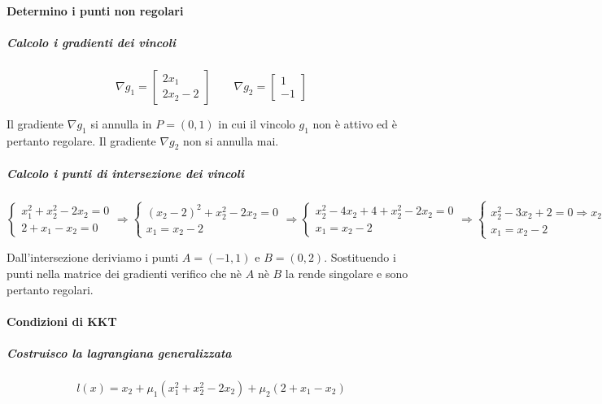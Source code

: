 \documentclass[\main/main.tex]{subfiles}
\begin{document}
\paragraph*{Determino i punti non regolari}

\subparagraph*{Calcolo i gradienti dei vincoli}

\[
  \nabla g_1 = \begin{bmatrix}
    2x_1 \\
    2x_2 - 2
  \end{bmatrix}
  \qquad
  \nabla g_2 = \begin{bmatrix}
    1 \\
    -1
  \end{bmatrix}
\]

Il gradiente $\nabla g_1$ si annulla in $P = (0, 1)$ in cui il vincolo $g_1$ non è attivo ed è pertanto regolare. Il gradiente $\nabla g_2$ non si annulla mai.

\subparagraph*{Calcolo i punti di intersezione dei vincoli}

\[
  \begin{cases}
    x_1^2 + x^2_2 -2x_2 = 0 \\
    2 + x_1 - x_2 = 0
  \end{cases}
  \Rightarrow
  \begin{cases}
    (x_2 - 2)^2 + x^2_2 -2x_2 = 0 \\
    x_1 = x_2 - 2
  \end{cases}
  \Rightarrow
  \begin{cases}
    x^2_2 -4x_2 + 4 + x^2_2 -2x_2 = 0 \\
    x_1 = x_2 - 2
  \end{cases}
  \Rightarrow
  \begin{cases}
    x^2_2 -3x_2 + 2 = 0 \Rightarrow x_2 = \frac{3 \pm \sqrt{9 - 8}}{2} = \frac{3 \pm 1}{2} \\
    x_1 = x_2 - 2
  \end{cases}
\]

Dall'intersezione deriviamo i punti $A = (-1, 1)$ e $B = (0, 2)$. Sostituendo i punti nella matrice dei gradienti verifico che nè $A$ nè $B$ la rende singolare e sono pertanto regolari.

\paragraph*{Condizioni di KKT}

\subparagraph*{Costruisco la lagrangiana generalizzata}
\[
  l(x) = x_2 + \mu_1 (x_1^2 + x^2_2 -2x_2) + \mu_2 (2 + x_1 - x_2)
\]
\end{document}
